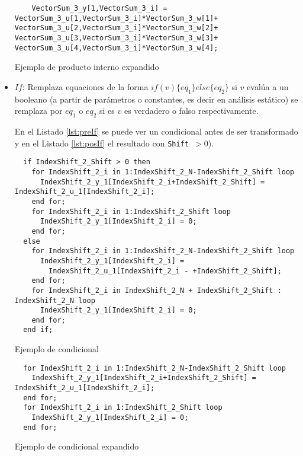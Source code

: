 \begin{itemize}
	
\begin{listing}[H]
\begin{verbatim}
    VectorSum_3_y[1,VectorSum_3_i] = VectorSum_3_u[1,VectorSum_3_i]*VectorSum_3_w[1]+ VectorSum_3_u[2,VectorSum_3_i]*VectorSum_3_w[2]+ VectorSum_3_u[3,VectorSum_3_i]*VectorSum_3_w[3]+ VectorSum_3_u[4,VectorSum_3_i]*VectorSum_3_w[4];
\end{verbatim}
\caption{Ejemplo de producto interno expandido}\label{lst:posProdInt}
\end{listing}

	\item $If$: Remplaza equaciones de la forma $if(v) \{eq_1\} else \{eq_2\}$ si $v$ evalúa a un booleano (a partir de parámetros o constantes, 
			es decir en análisis estático) se remplaza por $eq_1$ o $eq_2$ si es $v$ es verdadero o falso respectivamente.

	En el Listado \ref{lst:preIf} se puede ver un condicional antes de ser transformado y en el Listado \ref{lst:posIf} el resultado con \texttt{Shift $> 0$}).

\begin{listing}[htp]
\begin{verbatim}
  if IndexShift_2_Shift > 0 then
    for IndexShift_2_i in 1:IndexShift_2_N-IndexShift_2_Shift loop
      IndexShift_2_y_1[IndexShift_2_i+IndexShift_2_Shift] = IndexShift_2_u_1[IndexShift_2_i];
    end for;
    for IndexShift_2_i in 1:IndexShift_2_Shift loop
      IndexShift_2_y_1[IndexShift_2_i] = 0;
    end for;
  else
    for IndexShift_2_i in 1:IndexShift_2_N-IndexShift_2_Shift loop
      IndexShift_2_y_1[IndexShift_2_i] = 
		IndexShift_2_u_1[IndexShift_2_i - +IndexShift_2_Shift];
    end for;
    for IndexShift_2_i in IndexShift_2_N + IndexShift_2_Shift : IndexShift_2_N loop
      IndexShift_2_y_1[IndexShift_2_i] = 0;
    end for;
  end if;
\end{verbatim}
\caption{Ejemplo de condicional}\label{lst:preIf}
\end{listing}


\begin{listing}
\begin{verbatim}
  for IndexShift_2_i in 1:IndexShift_2_N-IndexShift_2_Shift loop
    IndexShift_2_y_1[IndexShift_2_i+IndexShift_2_Shift] = IndexShift_2_u_1[IndexShift_2_i];
  end for;
  for IndexShift_2_i in 1:IndexShift_2_Shift loop
    IndexShift_2_y_1[IndexShift_2_i] = 0;
  end for;
\end{verbatim}
\caption{Ejemplo de condicional expandido}\label{lst:posIf}
\end{listing}

\end{itemize}
